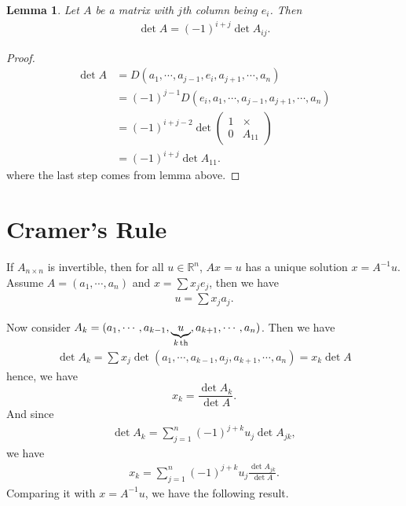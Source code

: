 \documentclass[11pt]{book}
\newtheorem{lemma}[theorem]{Lemma}
\theoremstyle{definition}
\numberwithin{equation}{chapter}
\begin{document}
\begin{lemma}
Let $A$ be a matrix with $j$th column being $e_i$. Then 
\begin{align*}
    \det A = (-1)^{i+j} \det A_{ij}.
\end{align*}
\end{lemma}
\begin{proof}
\begin{align*}
    \det A & = D(a_1,\cdots,a_{j-1}, e_i, a_{j+1}, \cdots, a_n) \\
    & = (-1)^{j-1} D(e_i, a_1,\cdots,a_{j-1}, a_{j+1}, \cdots, a_n) \\
    & = (-1)^{i+j-2} \det \left(
    \begin{matrix}
        1 & \times\\
        0 & A_{11}
    \end{matrix}
    \right) \\
    & = (-1)^{i+j} \det A_{11}.
\end{align*}
where the last step comes from lemma above. 
\end{proof}

\medskip

\section{Cramer's Rule}

If $A_{n\times n}$ is invertible, then for all $u\in\mathbb{R}^n$, $Ax = u$ has a unique solution $x = A^{-1}u$. Assume $A = (a_1, \cdots, a_n)$ and $x = \sum x_j e_j$, then we have 
\begin{align*}
    u = \sum x_j a_j.
\end{align*}

Now consider $A_k = (a_1, \cdots, a_{k-1}, \underbrace{u}_{k\,{\rm th}}, a_{k+1}, \cdots, a_n)$. Then we have 
\begin{align*}
    \det A_k = \sum x_j \det (a_1, \cdots, a_{k-1}, a_j, a_{k+1}, \cdots, a_n) = x_k \det A
\end{align*}
hence, we have
$$x_k = \frac{\det A_k}{\det A}.$$
And since 
\begin{align*}
    \det A_k = \sum^n_{j=1} (-1)^{j+k} u_j \det A_{jk},
\end{align*}
we have 
\begin{align*}
    x_k = \sum^n_{j=1} (-1)^{j+k} u_j \frac{\det A_{jk}}{\det A}.
\end{align*}
Comparing it with $x = A^{-1} u$, we have the following result.

\medskip
\end{document}
